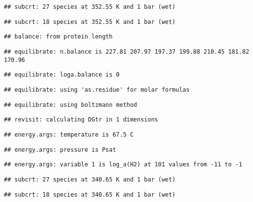 \documentclass[]{article}
\begin{document}
\begin{verbatim}
## subcrt: 27 species at 352.55 K and 1 bar (wet)
\end{verbatim}

\begin{verbatim}
## subcrt: 18 species at 352.55 K and 1 bar (wet)
\end{verbatim}

\begin{verbatim}
## balance: from protein length
\end{verbatim}

\begin{verbatim}
## equilibrate: n.balance is 227.81 207.97 197.37 199.88 210.45 181.82 170.96
\end{verbatim}

\begin{verbatim}
## equilibrate: loga.balance is 0
\end{verbatim}

\begin{verbatim}
## equilibrate: using 'as.residue' for molar formulas
\end{verbatim}

\begin{verbatim}
## equilibrate: using boltzmann method
\end{verbatim}

\begin{verbatim}
## revisit: calculating DGtr in 1 dimensions
\end{verbatim}

\begin{verbatim}
## energy.args: temperature is 67.5 C
\end{verbatim}

\begin{verbatim}
## energy.args: pressure is Psat
\end{verbatim}

\begin{verbatim}
## energy.args: variable 1 is log_a(H2) at 101 values from -11 to -1
\end{verbatim}

\begin{verbatim}
## subcrt: 27 species at 340.65 K and 1 bar (wet)
\end{verbatim}

\begin{verbatim}
## subcrt: 18 species at 340.65 K and 1 bar (wet)
\end{verbatim}
\end{document}
